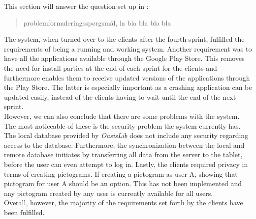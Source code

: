 This section will answer the question set up in :
\begin{quote}
problemformuleringsspørgsmål, la bla bla bla bla
\end{quote}

The system, when turned over to the clients after the fourth sprint, fulfilled the requirements of being a running and working system.
Another requirement was to have all the \giraf applications available through the Google Play Store.
This removes the need for install parties at the end of each sprint for the clients and furthermore enables them to receive updated versions of the applications through the Play Store. 
The latter is especially important as a crashing application can be updated easily, instead of the clients having to wait until the end of the next sprint.\\

However, we can also conclude that there are some problems with the \giraf system.
The most noticeable of these is the security problem the \giraf system currently has.
The local database provided by \textit{OasisLib} does not include any security regarding access to the database.
Furthermore, the synchronization between the local and remote database initiates by transferring all data from the server to the tablet, before the user can even attempt to log in.
Lastly, the clients required privacy in terms of creating pictograms.
If creating a pictogram as user A, showing that pictogram for user A should be an option.
This has not been implemented and any pictogram created by any user is currently available for all users.\\

Overall, however, the majority of the requirements set forth by the clients have been fulfilled.